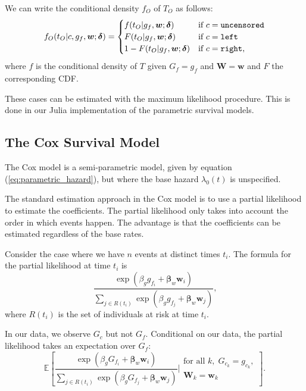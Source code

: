 \documentclass[12pt]{article}
\begin{document}
We can write the conditional density $f_O$ of $T_O$ as follows:
\begin{align}
    f_O(t_O | c, g_f, \boldsymbol w ; \boldsymbol \delta) =
    \begin{cases}
        f(t_O | g_f, \boldsymbol w ; \boldsymbol \delta)  & \text{if } c = \tt{uncensored} \\        
        F(t_O | g_f, \boldsymbol w ; \boldsymbol \delta)    & \text{if } c = \tt{left} \\
        1-F(t_O | g_f, \boldsymbol w ; \boldsymbol \delta)   & \text{if } c = \tt{right}  \text{,} \\        
    \end{cases} 
\end{align}
where $f$ is the conditional density of $T$ given $G_f = g_f$ and $\boldsymbol W = \boldsymbol w$ and $F$ the corresponding CDF.

These cases can be estimated with the maximum likelihood procedure. This is done in our Julia implementation of the parametric survival models.


\subsection{The Cox Survival Model}
The Cox model is a semi-parametric model, given by equation (\ref{eq:parametric_hazard}), but where the base hazard $\lambda_0(t)$ is unspecified.

The standard estimation approach in the Cox model is to use a partial likelihood to estimate the coefficients. The partial likelihood only takes into account the order in which events happen. The advantage is that the coefficients can be estimated regardless of the base rates.

Consider the case where we have $n$ events at distinct times $t_i$. The formula for the partial likelihood at time $t_i$ is
\[
    \frac{
        \exp\left(
            \beta_g g_{f_i} + \boldsymbol{\beta}_w \boldsymbol w_i
        \right)
    }{
        \sum_{j \in R(t_i)}
        \exp\left(
            \beta_g g_{f_j} + \boldsymbol{\beta}_w \boldsymbol w_j
        \right)
    }
    \text{,}
\]
where $R(t_i)$ is the set of individuals at risk at time $t_i$.

In our data, we observe $G_c$ but not $G_f$. Conditional on our data, the partial likelihood takes an expectation over $G_f$:
\[
    \mathbb{E} 
    \left[
    \frac{
        \exp\left(
            \beta_g G_{f_i} + \boldsymbol{\beta}_w \boldsymbol{w}_i
        \right)
    }{
        \displaystyle\sum_{j \in R(t_i)}
        \exp\left(
            \beta_g G_{f_j} + \boldsymbol{\beta}_w \boldsymbol{w}_j
        \right)
    }
    \mathrel{\Bigg|}
    \begin{array}{c}
        \text{for all } k, \; G_{c_k} = g_{c_k}, \\ 
        \boldsymbol{W}_k = \boldsymbol{w}_k
    \end{array}
    \right]
    \text{.}
\]
\end{document}
